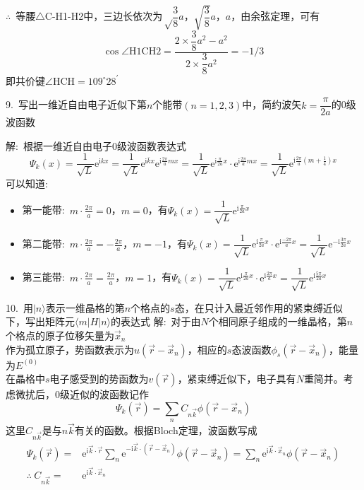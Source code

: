 $\therefore$~等腰$\bigtriangleup$\textrm{C-H1-H2}中，三边长依次为${\sqrt \dfrac38}a$，$\sqrt{\dfrac38}a$，$a$，由余弦定理，可有
\begin{displaymath}
	\cos\angle\mathrm{H1CH2}=\dfrac{2\times\dfrac38a^2-a^2}{2\times\dfrac38a^2}=-1/3
\end{displaymath}
即共价键$\angle\mathrm{HCH}=109^{\circ}28^{\prime}$

9.~写出一维近自由电子近似下第$n$个能带$(n=1,2,3)$中，简约波矢$k=\dfrac{\pi}{2a}$的0级波函数

解:~根据一维近自由电子0级波函数表达式
\begin{displaymath}
	\Psi_k(x)=\dfrac1{\sqrt L}\mathrm{e}^{\mathrm{i}kx}=\dfrac1{\sqrt L}\mathrm{e}^{\mathrm{i}\bar{k}x}\mathrm{e}^{\mathrm{i}\frac{2\pi}amx}=\dfrac1{\sqrt L}\mathrm{e}^{\mathrm{i}\frac{\pi}{2a}x}\cdot\mathrm{e}^{\mathrm{i}\frac{2\pi}amx}=\dfrac1{\sqrt L}\mathrm{e}^{\mathrm{i}\frac{2\pi}a(m+\frac14)x}
\end{displaymath}
可以知道:
\begin{itemize}
	\item 第一能带:~$m\cdot\frac{2\pi}{a}=0$，$m=0$，有$\Psi_k(x)=\dfrac1{\sqrt L}\mathrm{e}^{\mathrm{i}\frac{\pi}{2a}x}$
	\item 第二能带:~$m\cdot\frac{2\pi}{a}=-\frac{2\pi}{a}$，$m=-1$，有$\Psi_k(x)=\dfrac1{\sqrt L}\mathrm{e}^{\mathrm{i}\frac{\pi}{2a}x}\cdot\mathrm{e}^{\mathrm{i}\frac{-2\pi}{a}x}=\dfrac1{\sqrt L}\mathrm{e}^{-\mathrm{i}\frac{3\pi}{2a}x}$
	\item 第三能带:~$m\cdot\frac{2\pi}{a}=\frac{2\pi}{a}$，$m=1$，有$\Psi_k(x)=\dfrac1{\sqrt L}\mathrm{e}^{\mathrm{i}\frac{\pi}{2a}x}\cdot\mathrm{e}^{\mathrm{i}\frac{2\pi}{a}x}=\dfrac1{\sqrt L}\mathrm{e}^{\mathrm{i}\frac{5\pi}{2a}x}$
\end{itemize}

10.~用$|n\rangle$表示一维晶格的第$n$个格点的$s$态，在只计入最近邻作用的紧束缚近似下，写出矩阵元$\langle m|H|n\rangle$的表达式
解:~对于由$N$个相同原子组成的一维晶格，第$n$个格点的原子位移矢量为$\vec x_n$\\
作为孤立原子，势函数表示为$u(\vec r-\vec x_n)$，相应的$s$态波函数$\phi_s(\vec r-\vec x_n)$，能量为$E^{(0)}$\\
在晶格中$s$电子感受到的势函数为$v(\vec r)$，紧束缚近似下，电子具有$N$重简并。考虑微扰后，0级近似的波函数记作
\begin{displaymath}
	\Psi_k(\vec r)=\sum_nC_{n\vec k}\phi(\vec r-\vec x_n)
\end{displaymath}
这里$C_{n\vec k}$是与$n\vec k$有关的函数。根据\textrm{Bloch}定理，波函数写成
\begin{displaymath}
	\begin{aligned}
		\Psi_k(\vec r)=&\mathrm{e}^{\mathrm{i}\vec k\cdot\vec r}\sum_n\mathrm{e}^{-\mathrm{i}\vec k\cdot(\vec r-\vec x_n)}\phi(\vec r-\vec x_n)=\sum_n\mathrm{e}^{\mathrm{i}\vec k\cdot\vec x_n}\phi(\vec r-\vec x_n)\\
		\therefore~C_{n\vec k}=&\mathrm{e}^{\mathrm{i}\vec k\cdot\vec x_n}
	\end{aligned}
\end{displaymath}

